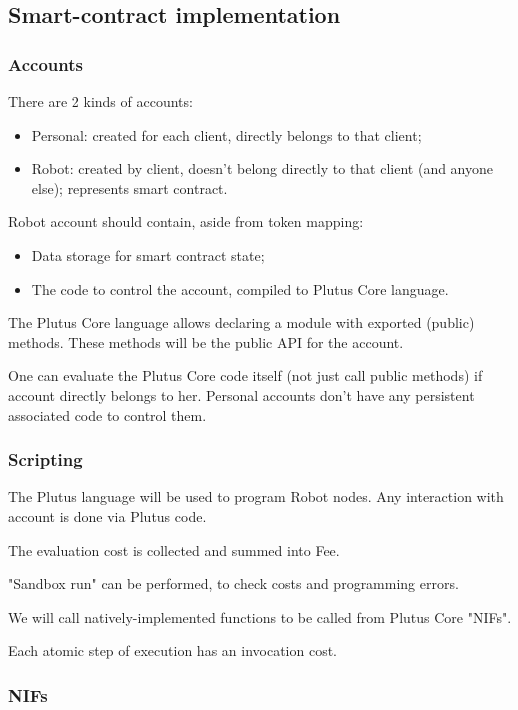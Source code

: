 \subsection{Smart-contract implementation}
\label{apx:smart-contracts}

\subsubsection{Accounts}

There are 2 kinds of accounts:
\begin{itemize}
  \item Personal: created for each client, directly belongs to that client;
  \item Robot: created by client, doesn't belong directly to that client (and anyone else); represents smart contract.
\end{itemize}

Robot account should contain, aside from token mapping:
\begin{itemize}
  \item Data storage for smart contract state;
  \item The code to control the account, compiled to Plutus Core language.
\end{itemize}

The Plutus Core language allows declaring a module with exported (public) methods.
These methods will be the public API for the account.

One can evaluate the Plutus Core code itself (not just call public methods) if account directly belongs to her.
Personal accounts don't have any persistent associated code to control them.

\subsubsection{Scripting}

The Plutus language will be used to program Robot nodes.
Any interaction with account is done via Plutus code.

The evaluation cost is collected and summed into Fee.

"Sandbox run" can be performed, to check costs and programming errors.

We will call natively-implemented functions to be called from Plutus Core "NIFs".

Each atomic step of execution has an invocation cost.

\subsubsection{NIFs}

